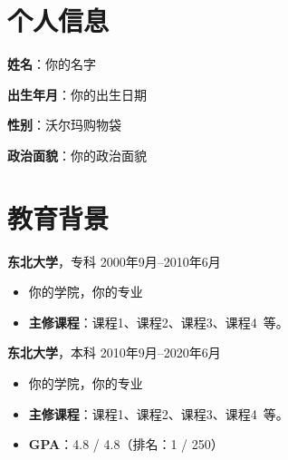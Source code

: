\documentclass[11pt,a4paper]{ctexart}
\newlength{\iconwidth}
\begin{document}
    \begin{minipage}[t]{0.78\textwidth}
        \begin{minipage}[t]{\textwidth}
        \section[个人信息]{\makebox[\iconwidth][c]{\color{primary_color}{\faAddressCard}}\quad 个人信息}
        
        \begin{minipage}[t]{0.5\textwidth}
            \textbf{姓\qquad 名}：你的名字
            
            \vspace{0.5em}
            \textbf{出生年月}：你的出生日期
        \end{minipage}
        \begin{minipage}[t]{0.35\textwidth}
            \textbf{性\qquad 别}：沃尔玛购物袋
            
            \vspace{0.5em}
            \textbf{政治面貌}：你的政治面貌
        \end{minipage}
        \vspace{1.2em}
        \end{minipage}

        \begin{minipage}[t]{\textwidth}
        \section[教育背景]{\makebox[\iconwidth][c]{\color{primary_color}{\faGraduationCap}}\quad 教育背景}
        
        {\large \textbf{东北大学}}，专科 \hfill 2000年9月--2010年6月
        \begin{itemize}
            \item 你的学院，你的专业
            \item \textbf{主修课程}：课程1、课程2、课程3、课程4\ 等。
        \end{itemize}
        
        \vspace{0.5em}
        {\large \textbf{东北大学}}，本科 \hfill 2010年9月--2020年6月
        \begin{itemize}
            \item 你的学院，你的专业
            \item \textbf{主修课程}：课程1、课程2、课程3、课程4\ 等。
            \item \textbf{GPA}：4.8 / 4.8（排名：1 / 250）
        \end{itemize}
        

\end{minipage}
\end{minipage}
\end{document}
